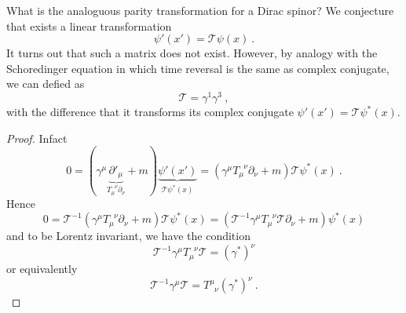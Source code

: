     What is the analoguous parity transformation for a Dirac spinor? We conjecture that exists a linear transformation 
    \begin{equation*}
        \psi' (x') = \mathcal T \psi(x) ~.
    \end{equation*}
    It turns out that such a matrix does not exist. However, by analogy with the Schoredinger equation in which time reversal is the same as complex conjugate, we can defied as 
    \begin{equation*}
        \mathcal T = \gamma^1 \gamma^3 ~,
    \end{equation*}
    with the difference that it transforms its complex conjugate $\psi'(x') = \mathcal T \psi^* (x)$.
    \begin{proof}
        Infact
        \begin{equation*}
            0 = (\gamma^\mu \underbrace{{\partial'}_\mu}_{T_\mu^{\phantom \mu \nu} \partial_\nu} + m) \underbrace{\psi'(x')}_{\mathcal T \psi^* (x)} = (\gamma^\mu T_\mu^{\phantom \mu \nu} \partial_\nu + m) \mathcal T \psi^*(x) ~.
        \end{equation*}
        Hence 
        \begin{equation*}
            0 = \mathcal T^{-1}(\gamma^\mu T_\mu^{\phantom \mu \nu} \partial_\nu + m)\mathcal T \psi^*(x) = (\mathcal T^{-1}\gamma^\mu T_\mu^{\phantom \mu \nu} \mathcal T \partial_\nu + m) \psi^*(x)
        \end{equation*}
        and to be Lorentz invariant, we have the condition 
        \begin{equation*}
            \mathcal T^{-1}\gamma^\mu T_\mu^{\phantom \mu \nu} \mathcal T = (\gamma^*)^\nu
        \end{equation*}
        or equivalently
        \begin{equation*}
            \mathcal T^{-1}\gamma^\mu \mathcal T = T^\mu_{\phantom \mu \nu} (\gamma^*)^\nu ~.
        \end{equation*}


\end{proof}
